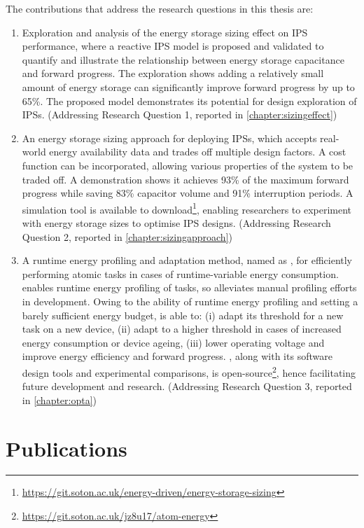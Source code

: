 The contributions that address the research questions in this thesis are:
\begin{enumerate}

\item Exploration and analysis of the energy storage sizing effect on IPS performance, where a reactive IPS model is proposed and validated to quantify and illustrate the relationship between energy storage capacitance and forward progress. 
The exploration shows adding a relatively small amount of energy storage can significantly improve forward progress by up to 65\%. 
The proposed model demonstrates its potential for design exploration of IPSs.
(Addressing Research Question 1, reported in \cref{chapter:sizingeffect})

\item An energy storage sizing approach for deploying IPSs, which accepts real-world energy availability data and trades off multiple design factors.
A cost function can be incorporated, allowing various properties of the system to be traded off. 
A demonstration shows it achieves 93\% of the maximum forward progress while saving 83\% capacitor volume and 91\% interruption periods. 
A simulation tool is available to download\footnote{\url{https://git.soton.ac.uk/energy-driven/energy-storage-sizing}}, enabling researchers to experiment with energy storage sizes to optimise IPS designs.
(Addressing Research Question 2, reported in \cref{chapter:sizingapproach})

\item A runtime energy profiling and adaptation method, named as \nn{}, for efficiently performing atomic tasks in cases of runtime-variable energy consumption. 
\nn{} enables runtime energy profiling of tasks, so alleviates manual profiling efforts in development.
Owing to the ability of runtime energy profiling and setting a barely sufficient energy budget, \nn{} is able to: (i) adapt its threshold for a new task on a new device, (ii) adapt to a higher threshold in cases of increased energy consumption or device ageing, (iii) lower operating voltage and improve energy efficiency and forward progress. 
\nn{}, along with its software design tools and experimental comparisons, is open-source\footnote{\url{https://git.soton.ac.uk/jz8u17/atom-energy}}, hence facilitating future development and research.
(Addressing Research Question 3, reported in \cref{chapter:opta})

\end{enumerate}


\section{Publications}

